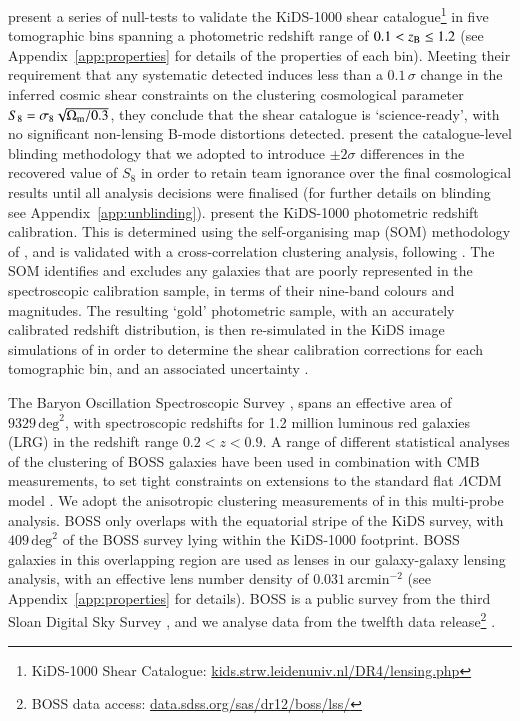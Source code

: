 \citet{giblin/etal:inprep} present a series of null-tests to validate the KiDS-1000 shear catalogue\footnote{KiDS-1000 Shear Catalogue: \href{http://kids.strw.leidenuniv.nl/DR4/lensing.php}{kids.strw.leidenuniv.nl/DR4/lensing.php}} in five tomographic bins spanning a 
photometric redshift range of $0.1 < z_{\rm B} \leq 1.2$ (see Appendix~\ref{app:properties} for details of the properties of each bin).  
Meeting their requirement that any systematic detected induces less than a $0.1\,\sigma$ change in the inferred 
cosmic shear constraints on the clustering cosmological parameter $S_8 = \sigma_8\sqrt{\Omega_{\rm m}/0.3}$, they conclude that the shear catalogue is `science-ready', with no significant non-lensing B-mode distortions detected.  \citet{kuijken/etal:2015} present the catalogue-level blinding methodology that we adopted to introduce $\pm 2\sigma$ differences in the recovered value of $S_8$ in order
to retain team ignorance over the final cosmological results until all 
analysis decisions were finalised (for further details on blinding see Appendix~\ref{app:unblinding}).
\citet{hildebrandt/etal:inprep} present the KiDS-1000 photometric redshift calibration.  This is determined using the self-organising map (SOM) methodology of \citet{wright/etal:2020}, and is validated with a cross-correlation clustering analysis, following \citet{vandenbusch/etal:2020}.
The SOM identifies and excludes any galaxies that are poorly represented in the spectroscopic calibration sample, in terms of their nine-band colours and magnitudes. The resulting `gold' photometric sample, with an accurately calibrated redshift distribution, is then re-simulated in the KiDS image simulations of \citet{kannawadi/etal:2019} in order to determine the shear calibration corrections for each tomographic bin, and an associated uncertainty \citep[see][for full details]{giblin/etal:inprep,hildebrandt/etal:inprep}.
 
The Baryon Oscillation Spectroscopic Survey
\citep[BOSS,][]{alam/etal:2015}, spans an effective area of $9329\,\mathrm{deg}^{2}$, with spectroscopic redshifts for 1.2 million luminous red
galaxies (LRG) in the redshift range $0.2<z<0.9$.   A range of
different statistical analyses of the clustering of BOSS galaxies have been used in combination with CMB
measurements, to set tight constraints on extensions to the standard
flat $\Lambda$CDM model \citep[see][and references
therein]{alam/etal:2017,eBOSS/etal:2020}.   We adopt the anisotropic clustering
measurements of \citet{sanchez/etal:2017} in this multi-probe analysis.
BOSS only overlaps with the equatorial stripe
of the KiDS survey, with $409\,\mathrm{deg}^{2}$ of the BOSS survey lying within
the KiDS-1000 footprint.  BOSS galaxies in this overlapping region are used as lenses in
our galaxy-galaxy lensing analysis, with an effective lens number density of $0.031\,\mathrm{arcmin}^{-2}$ (see Appendix~\ref{app:properties} for details).  BOSS is a public survey from the third Sloan
Digital Sky Survey \citep{york/etal:2000}, and we analyse data from the twelfth data release\footnote{BOSS data access: \href{https://data.sdss.org/sas/dr12/boss/lss/}{data.sdss.org/sas/dr12/boss/lss/}} \citep[DR12,][]{alam/etal:2015}. 

